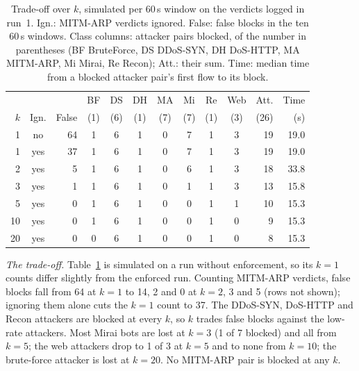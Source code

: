 \begin{table}[t]
\centering
\caption{Trade-off over $k$, simulated per 60\,s window on the verdicts logged in run~1. Ign.: MITM-ARP verdicts ignored. False: false blocks in the ten 60\,s windows. Class columns: attacker pairs blocked, of the number in parentheses (BF BruteForce, DS DDoS-SYN, DH DoS-HTTP, MA MITM-ARP, Mi Mirai, Re Recon); Att.: their sum. Time: median time from a blocked attacker pair's first flow to its block.}
\label{tab:kcurve}
\footnotesize
\setlength{\tabcolsep}{2.4pt}
\begin{tabular}{rcrcccccccrr}
\hline
 & & & BF & DS & DH & MA & Mi & Re & Web & Att. & Time \\
$k$ & Ign. & False & (1) & (6) & (1) & (7) & (7) & (1) & (3) & (26) & (s) \\
\hline
1  & no  & 64 & 1 & 6 & 1 & 0 & 7 & 1 & 3 & 19 & 19.0 \\
1  & yes & 37 & 1 & 6 & 1 & 0 & 7 & 1 & 3 & 19 & 19.0 \\
2  & yes &  5 & 1 & 6 & 1 & 0 & 6 & 1 & 3 & 18 & 33.8 \\
3  & yes &  1 & 1 & 6 & 1 & 0 & 1 & 1 & 3 & 13 & 15.8 \\
5  & yes &  0 & 1 & 6 & 1 & 0 & 0 & 1 & 1 & 10 & 15.3 \\
10 & yes &  0 & 1 & 6 & 1 & 0 & 0 & 1 & 0 &  9 & 15.3 \\
20 & yes &  0 & 0 & 6 & 1 & 0 & 0 & 1 & 0 &  8 & 15.3 \\
\hline
\end{tabular}
\end{table}

\emph{The trade-off.} Table~\ref{tab:kcurve} is simulated on a run without enforcement, so its $k=1$ counts differ slightly from the enforced run. Counting MITM-ARP verdicts, false blocks fall from 64 at $k=1$ to 14, 2 and 0 at $k=2$, 3 and 5 (rows not shown); ignoring them alone cuts the $k=1$ count to 37. The DDoS-SYN, DoS-HTTP and Recon attackers are blocked at every $k$, so $k$ trades false blocks against the low-rate attackers. Most Mirai bots are lost at $k=3$ (1 of 7 blocked) and all from $k=5$; the web attackers drop to 1 of 3 at $k=5$ and to none from $k=10$; the brute-force attacker is lost at $k=20$. No MITM-ARP pair is blocked at any $k$.

